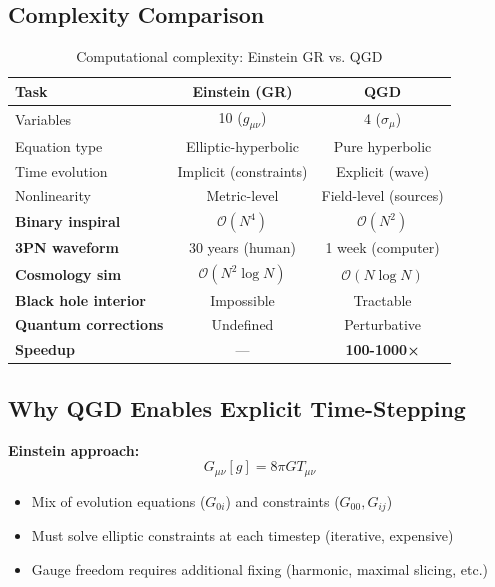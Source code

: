 \documentclass[11pt,a4paper]{article}
\theoremstyle{definition}
\theoremstyle{remark}
\begin{document}
	\subsection{Complexity Comparison}
	
	\begin{table}[h]
		\centering
		\caption{Computational complexity: Einstein GR vs. QGD}
		\begin{tabular}{@{}lcc@{}}
			\toprule
			\textbf{Task} & \textbf{Einstein (GR)} & \textbf{QGD} \\
			\midrule
			Variables & 10 ($g_{\mu\nu}$) & 4 ($\sigma_\mu$) \\
			Equation type & Elliptic-hyperbolic & Pure hyperbolic \\
			Time evolution & Implicit (constraints) & Explicit (wave) \\
			Nonlinearity & Metric-level & Field-level (sources) \\
			\midrule
			\textbf{Binary inspiral} & $\mathcal{O}(N^4)$ & $\mathcal{O}(N^2)$ \\
			\textbf{3PN waveform} & 30 years (human) & 1 week (computer) \\
			\textbf{Cosmology sim} & $\mathcal{O}(N^2\log N)$ & $\mathcal{O}(N\log N)$ \\
			\textbf{Black hole interior} & Impossible & Tractable \\
			\textbf{Quantum corrections} & Undefined & Perturbative \\
			\midrule
			\textbf{Speedup} & --- & \textbf{100-1000×} \\
			\bottomrule
		\end{tabular}
	\end{table}
	
	\subsection{Why QGD Enables Explicit Time-Stepping}
	
	\textbf{Einstein approach:}
	\begin{equation}
		G_{\mu\nu}[g] = 8\pi G T_{\mu\nu}
	\end{equation}
	\begin{itemize}
		\item Mix of evolution equations ($G_{0i}$) and constraints ($G_{00}, G_{ij}$)
		\item Must solve elliptic constraints at each timestep (iterative, expensive)
		\item Gauge freedom requires additional fixing (harmonic, maximal slicing, etc.)
	\end{itemize}
	
\end{document}
